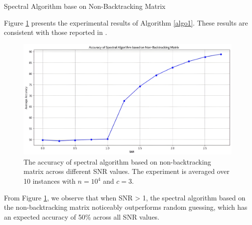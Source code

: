 \begin{algorithm}[H]\label{algo1}
\SetAlgoLined       %
\LinesNumbered
{}
\BlankLine
\caption{Spectral Algorithm base on Non-Backtracking Matrix}
\end{algorithm}
\clearpage
Figure \ref{fig:spec_algo} presents the experimental results of Algorithm \ref{algo1}. These results are consistent with those reported in \cite{the_non-backtracking}.
\begin{figure}[H]
    \centering
    \includegraphics[width=1\linewidth]{Figures/spec_algo.jpg}
    \caption[Accuracy of the Spectral Algorithm based on Non-Backtracking Matrix]{The accuracy of spectral algorithm based on non-backtracking matrix across different SNR values. The experiment is averaged over 10 instances with $n=10^4$ and $c=3.$}
    \label{fig:spec_algo}
\end{figure}
From Figure \ref{fig:spec_algo}, we observe that when SNR > 1, the spectral algorithm based on the non-backtracking matrix noticeably outperforms random guessing, which has an expected accuracy of 50\% across all SNR values.
